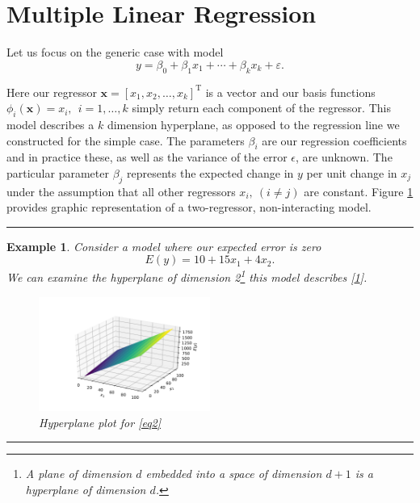 \documentclass[10pt,a4paper, onecolumn, conference]{IEEEtran}
\theoremstyle{own}
\newtheorem{example}{Example}
\theoremstyle{definition}
\theoremstyle{plain}
\begin{document}
\section{Multiple Linear Regression}
Let us focus on the generic case with model
\begin{equation}
y = \beta_0 + \beta_1 x_1 + \cdots + \beta_k x_k + \varepsilon.
\end{equation}

Here our regressor $\mathbf{x} = \left[ x_1, x_2, \ldots, x_k \right]^{\text{T}}$ is a vector and our basis functions $\phi_i(\mathbf{x}) = x_i,~~ i = 1, \ldots, k$ simply return each component of the regressor. This model describes a $k$ dimension hyperplane, as opposed to the regression line we constructed for the simple case. The parameters $\beta_i$ are our regression coefficients and in practice these, as well as the variance of the error $\epsilon$, are unknown. The particular parameter $\beta_j$ represents the expected change in $y$ per unit change in $x_j$ under the assumption that all other regressors $x_i,~( i \neq j )$ are constant. Figure \ref{fig1} provides graphic representation of a two-regressor, non-interacting model.
\vspace{2mm}
\hrule
\begin{example}
Consider a model where our expected error is zero
\begin{equation} \label{eq2}
E(y) = 10 + 15x_1 + 4x_2.
\end{equation}
We can examine the hyperplane of dimension 2\footnote{A plane of dimension $d$ embedded into a space of dimension $d+1$ is a hyperplane of dimension $d$.} this model describes [\ref{fig1}].
\begin{figure}[H]
\centering
\includegraphics[width = 0.5\textwidth]{f4}
\caption{Hyperplane plot for \cref{eq2}}
\label{fig1}
\end{figure}
\end{example}
\hrule
\vspace{2mm}
\end{document}
